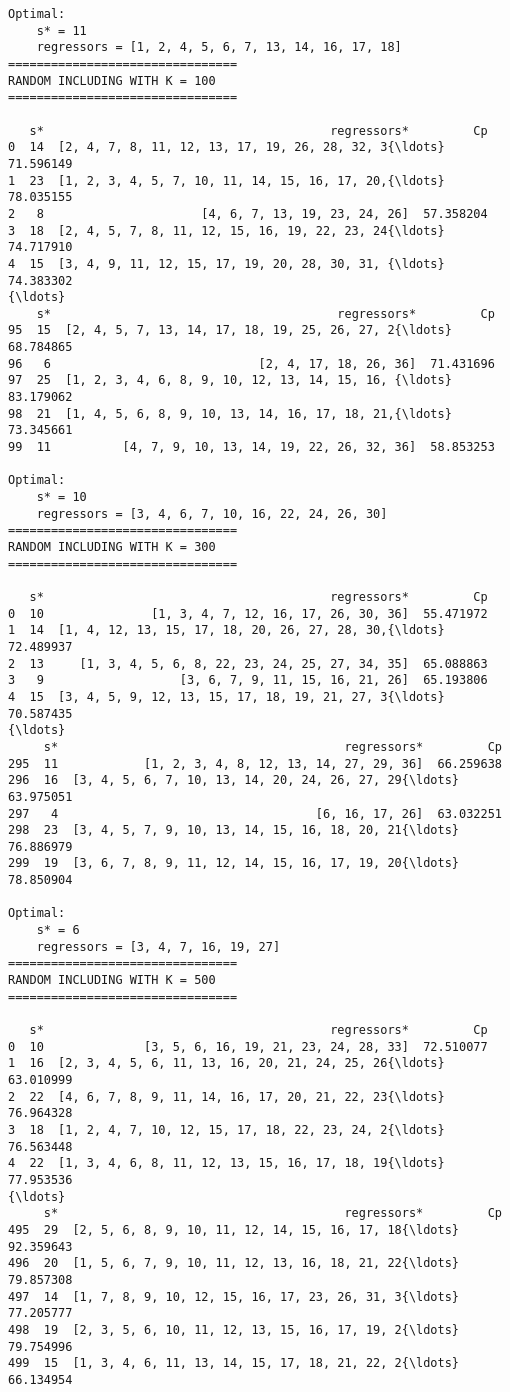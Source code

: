 \documentclass[11pt]{article}
\begin{document}
\begin{Verbatim}[commandchars=\\\{\}]
Optimal:
	s* = 11
	regressors = [1, 2, 4, 5, 6, 7, 13, 14, 16, 17, 18]
================================
RANDOM INCLUDING WITH K = 100
================================

   s*                                        regressors*         Cp
0  14  [2, 4, 7, 8, 11, 12, 13, 17, 19, 26, 28, 32, 3{\ldots}  71.596149
1  23  [1, 2, 3, 4, 5, 7, 10, 11, 14, 15, 16, 17, 20,{\ldots}  78.035155
2   8                      [4, 6, 7, 13, 19, 23, 24, 26]  57.358204
3  18  [2, 4, 5, 7, 8, 11, 12, 15, 16, 19, 22, 23, 24{\ldots}  74.717910
4  15  [3, 4, 9, 11, 12, 15, 17, 19, 20, 28, 30, 31, {\ldots}  74.383302
{\ldots}
    s*                                        regressors*         Cp
95  15  [2, 4, 5, 7, 13, 14, 17, 18, 19, 25, 26, 27, 2{\ldots}  68.784865
96   6                             [2, 4, 17, 18, 26, 36]  71.431696
97  25  [1, 2, 3, 4, 6, 8, 9, 10, 12, 13, 14, 15, 16, {\ldots}  83.179062
98  21  [1, 4, 5, 6, 8, 9, 10, 13, 14, 16, 17, 18, 21,{\ldots}  73.345661
99  11          [4, 7, 9, 10, 13, 14, 19, 22, 26, 32, 36]  58.853253

Optimal:
	s* = 10
	regressors = [3, 4, 6, 7, 10, 16, 22, 24, 26, 30]
================================
RANDOM INCLUDING WITH K = 300
================================

   s*                                        regressors*         Cp
0  10               [1, 3, 4, 7, 12, 16, 17, 26, 30, 36]  55.471972
1  14  [1, 4, 12, 13, 15, 17, 18, 20, 26, 27, 28, 30,{\ldots}  72.489937
2  13     [1, 3, 4, 5, 6, 8, 22, 23, 24, 25, 27, 34, 35]  65.088863
3   9                   [3, 6, 7, 9, 11, 15, 16, 21, 26]  65.193806
4  15  [3, 4, 5, 9, 12, 13, 15, 17, 18, 19, 21, 27, 3{\ldots}  70.587435
{\ldots}
     s*                                        regressors*         Cp
295  11            [1, 2, 3, 4, 8, 12, 13, 14, 27, 29, 36]  66.259638
296  16  [3, 4, 5, 6, 7, 10, 13, 14, 20, 24, 26, 27, 29{\ldots}  63.975051
297   4                                    [6, 16, 17, 26]  63.032251
298  23  [3, 4, 5, 7, 9, 10, 13, 14, 15, 16, 18, 20, 21{\ldots}  76.886979
299  19  [3, 6, 7, 8, 9, 11, 12, 14, 15, 16, 17, 19, 20{\ldots}  78.850904

Optimal:
	s* = 6
	regressors = [3, 4, 7, 16, 19, 27]
================================
RANDOM INCLUDING WITH K = 500
================================

   s*                                        regressors*         Cp
0  10              [3, 5, 6, 16, 19, 21, 23, 24, 28, 33]  72.510077
1  16  [2, 3, 4, 5, 6, 11, 13, 16, 20, 21, 24, 25, 26{\ldots}  63.010999
2  22  [4, 6, 7, 8, 9, 11, 14, 16, 17, 20, 21, 22, 23{\ldots}  76.964328
3  18  [1, 2, 4, 7, 10, 12, 15, 17, 18, 22, 23, 24, 2{\ldots}  76.563448
4  22  [1, 3, 4, 6, 8, 11, 12, 13, 15, 16, 17, 18, 19{\ldots}  77.953536
{\ldots}
     s*                                        regressors*         Cp
495  29  [2, 5, 6, 8, 9, 10, 11, 12, 14, 15, 16, 17, 18{\ldots}  92.359643
496  20  [1, 5, 6, 7, 9, 10, 11, 12, 13, 16, 18, 21, 22{\ldots}  79.857308
497  14  [1, 7, 8, 9, 10, 12, 15, 16, 17, 23, 26, 31, 3{\ldots}  77.205777
498  19  [2, 3, 5, 6, 10, 11, 12, 13, 15, 16, 17, 19, 2{\ldots}  79.754996
499  15  [1, 3, 4, 6, 11, 13, 14, 15, 17, 18, 21, 22, 2{\ldots}  66.134954


\end{Verbatim}
\end{document}
